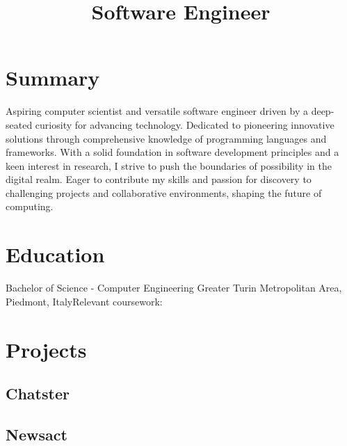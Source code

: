 \documentclass[letterpaper, nocolor, draft]{moderncv}
\begin{document}
\title{Software Engineer}
\maketitle

\section{Summary}
Aspiring computer scientist and versatile software engineer driven by a deep-seated curiosity for advancing technology. Dedicated to pioneering innovative solutions through comprehensive knowledge of programming languages and frameworks. With a solid foundation in software development principles and a keen interest in research, I strive to push the boundaries of possibility in the digital realm. Eager to contribute my skills and passion for discovery to challenging projects and collaborative environments, shaping the future of computing.

\section{Education}
 {Bachelor of Science - Computer Engineering}{
Greater Turin Metropolitan Area, Piedmont, Italy}{}{Relevant coursework:   }

\section{Projects}

\subsection{Chatster}


\subsection{Newsact}

\end{document}
